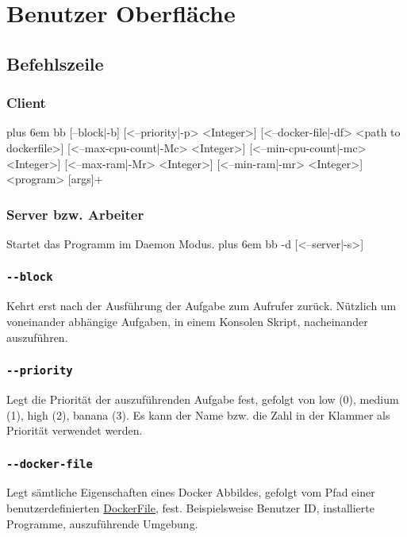 \documentclass[a4paper,12pt]{article}
\makeatletter
\newenvironment{mycode}
 {\def\@xobeysp{\ }\verbatim\rightskip=0pt plus 6em\relax}
 {\endverbatim}
\makeatother
\begin{document}




\section{Benutzer Oberfläche}
\subsection{Befehlszeile}
\subsubsection{Client}
\begin{mycode}
bb [--block|-b] [<--priority|-p> <Integer>] [<--docker-file|-df> <path to dockerfile>] [<--max-cpu-count|-Mc> <Integer>] [<--min-cpu-count|-mc> <Integer>] [<--max-ram|-Mr> <Integer>] [<--min-ram|-mr> <Integer>] <program> [args]+
\end{mycode}

\subsubsection{Server bzw. Arbeiter}
Startet das Programm im \gls{Daemon} Modus.
\begin{mycode}
bb -d [<--server|-s>]
\end{mycode}

\subsubsection{\texttt{-{}-block}}
Kehrt erst nach der Ausführung der Aufgabe zum Aufrufer zurück. Nützlich um voneinander abhängige Aufgaben, in einem Konsolen Skript, nacheinander auszuführen.

\subsubsection{\texttt{-{}-priority}}
Legt die Priorität der auszuführenden Aufgabe fest, gefolgt von low (0), medium (1), high (2), banana (3).
Es kann der Name bzw. die Zahl in der Klammer als Priorität verwendet werden.

\subsubsection{\texttt{-{}-docker-file}}
Legt sämtliche Eigenschaften eines Docker Abbildes, gefolgt vom Pfad einer benutzerdefinierten \href{https://docs.docker.com/engine/reference/builder/}{DockerFile}, fest.
Beispielsweise Benutzer ID, installierte Programme, auszuführende Umgebung.
\end{document}
